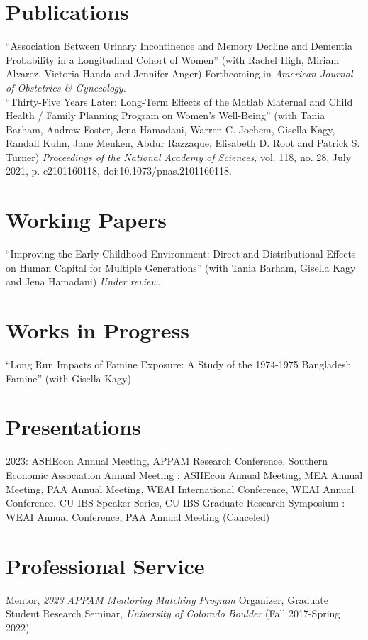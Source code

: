 \documentclass[letterpaper]{article}
\begin{document}
\section*{Publications}
``Association Between Urinary Incontinence and Memory Decline and Dementia Probability in a Longitudinal Cohort of Women'' (with Rachel High, Miriam Alvarez, Victoria Handa and Jennifer Anger) Forthcoming in \textit{American Journal of Obstetrics \& Gynecology.}
\\[.5em]
``Thirty-Five Years Later: Long-Term Effects of the Matlab Maternal and Child Health / Family Planning Program on Women's Well-Being'' (with Tania Barham, Andrew Foster, Jena Hamadani, Warren C. Jochem, Gisella Kagy, Randall Kuhn, Jane Menken, Abdur Razzaque, Elisabeth D. Root and Patrick S. Turner) \textit{Proceedings of the National Academy of Sciences}, vol. 118, no. 28, July 2021, p. e2101160118, doi:10.1073/pnas.2101160118.


\section*{Working Papers}
``Improving the Early Childhood Environment: Direct and Distributional Effects on Human Capital for Multiple Generations'' (with Tania Barham, Gisella Kagy and Jena Hamadani) \textit{Under review.}

\section*{Works in Progress}
``Long Run Impacts of Famine Exposure: A Study of the 1974-1975 Bangladesh Famine'' (with Gisella Kagy)

\section*{Presentations}
2023: ASHEcon Annual Meeting, APPAM Research Conference, Southern Economic Association Annual Meeting
\newline{}: ASHEcon Annual Meeting, MEA Annual Meeting, PAA Annual Meeting, WEAI International Conference, WEAI Annual Conference, CU IBS Speaker Series, CU IBS Graduate Research Symposium
\newline{}: WEAI Annual Conference, PAA Annual Meeting (Canceled)

\section*{Professional Service}
Mentor, \textit{2023 APPAM Mentoring Matching Program}
\newline\newline
Organizer, Graduate Student Research Seminar, \textit{University of Colorado Boulder} (Fall 2017-Spring 2022)
\end{document}
